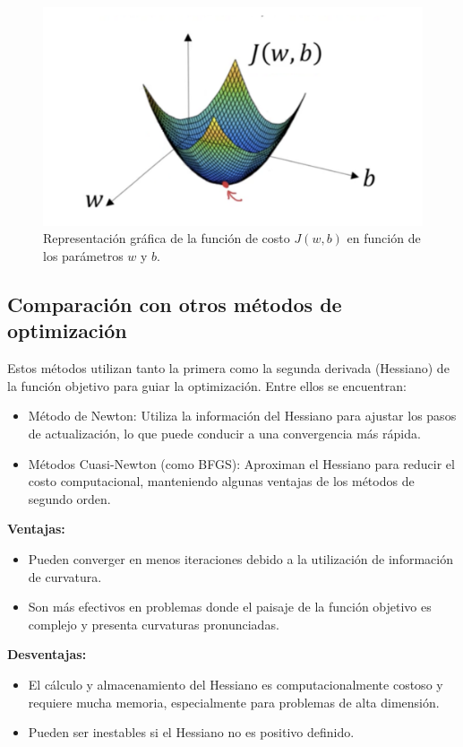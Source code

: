 \documentclass{article}
\begin{document}
   \begin{figure}[h]
	\centering
	\includegraphics[width=0.5\linewidth]{melissa.png}
	\caption{Representación gráfica de la función de costo \( J(w, b) \) en función de los parámetros \( w \) y \( b \).}
	\label{fig:gradiente}
    \end{figure}
	
	
	\subsection{Comparación con otros métodos de optimización}
	
	Estos métodos utilizan tanto la primera como la segunda derivada (Hessiano) de la función objetivo para guiar la optimización. Entre ellos se encuentran:
	
	\begin{itemize}
		\item Método de Newton: Utiliza la información del Hessiano para ajustar los pasos de actualización, lo que puede conducir a una convergencia más rápida.
		\item Métodos Cuasi-Newton (como BFGS): Aproximan el Hessiano para reducir el costo computacional, manteniendo algunas ventajas de los métodos de segundo orden.
	\end{itemize}
	
	\textbf{Ventajas:}
	\begin{itemize}
		\item Pueden converger en menos iteraciones debido a la utilización de información de curvatura.
		\item Son más efectivos en problemas donde el paisaje de la función objetivo es complejo y presenta curvaturas pronunciadas.
	\end{itemize}
	
	\textbf{Desventajas:}
	\begin{itemize}
		\item El cálculo y almacenamiento del Hessiano es computacionalmente costoso y requiere mucha memoria, especialmente para problemas de alta dimensión.
		\item Pueden ser inestables si el Hessiano no es positivo definido.
	\end{itemize}
	
\end{document}
